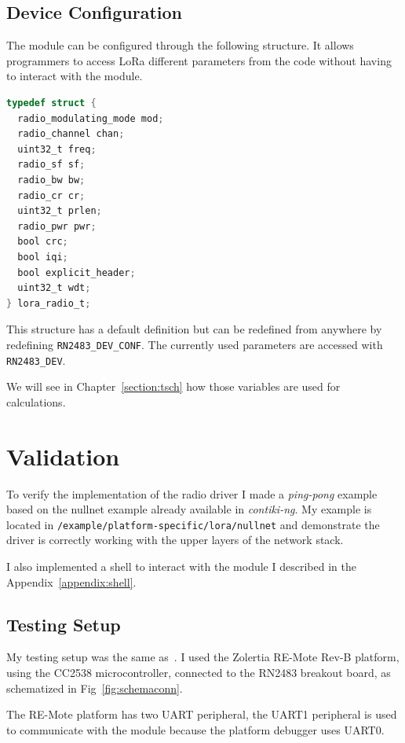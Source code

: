 

\subsection{Device Configuration}

The module can be configured through the following structure.
It allows programmers to access LoRa different parameters from the code without
having to interact with the module.

\begin{lstlisting}[language=C]
typedef struct {
  radio_modulating_mode mod;
  radio_channel chan;
  uint32_t freq;
  radio_sf sf;
  radio_bw bw;
  radio_cr cr;
  uint32_t prlen;
  radio_pwr pwr;
  bool crc;
  bool iqi;
  bool explicit_header;
  uint32_t wdt;
} lora_radio_t;
\end{lstlisting}

This structure has a default definition but can be redefined from anywhere
by redefining \lstinline{RN2483_DEV_CONF}.
The currently used parameters are accessed with \lstinline{RN2483_DEV}.

We will see in Chapter~\ref{section:tsch} how those variables are used for
calculations.

\section{Validation}

To verify the implementation of the radio driver I made
a \emph{ping-pong} example based on the nullnet example already
available in \emph{contiki-ng}.
My example is located in \lstinline{/example/platform-specific/lora/nullnet}
and demonstrate the driver is correctly working with the upper layers of the
network stack.

I also implemented a shell to interact with the module I described
in the Appendix~\ref{appendix:shell}.

\subsection{Testing Setup}

My testing setup was the same as~\cite{8847137}. I used the Zolertia RE-Mote
Rev-B platform, using the CC2538 microcontroller, connected to the
RN2483 breakout board, as schematized in Fig~\ref{fig:schemaconn}.

The RE-Mote platform has two UART peripheral, the UART1 peripheral is used
to communicate with the module because the platform debugger uses UART0.


